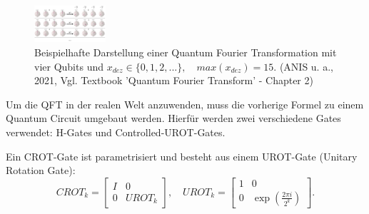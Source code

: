 \begin{figure}

    \includegraphics[width=100]{content/qft_example.JPG}
    \caption{Beispielhafte Darstellung einer Quantum Fourier Transformation mit vier Qubits und \(x_{dez} \in \{0,1,2,...\}, \quad max(x_{dez}) = 15\). (ANIS u. a., 2021, Vgl. Textbook ’Quantum Fourier Transform’ - Chapter 2)}


\end{figure}

\newline 
{}
\newline \newline

Um die QFT in der realen Welt anzuwenden, muss die vorherige Formel zu einem Quantum Circuit umgebaut werden. Hierfür werden zwei verschiedene Gates verwendet: H-Gates und Controlled-UROT-Gates. \newline

Ein CROT-Gate ist parametrisiert und besteht aus einem UROT-Gate (Unitary Rotation Gate):
\begin{equation}
    CROT_k=\begin{bmatrix}
        I & 0 \\ 0 & UROT_k
    \end{bmatrix}, \quad
    UROT_k = \begin{bmatrix}
        1 & 0 \\ 0 & \exp (\frac{2 \pi i}{2^k})
    \end{bmatrix}.
\end{equation}

